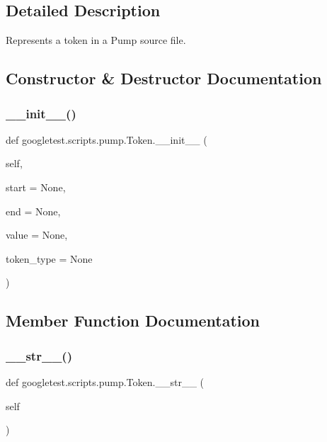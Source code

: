 \subsection{Detailed Description}
\begin{DoxyVerb}Represents a token in a Pump source file.\end{DoxyVerb}
 

\subsection{Constructor \& Destructor Documentation}
\mbox{\label{classgoogletest_1_1scripts_1_1pump_1_1_token_a437e6b5cf6101dfd30b96e72232d5c36}} 
\subsubsection{\texorpdfstring{\_\_init\_\_()}{\_\_init\_\_()}}
{\footnotesize\ttfamily def googletest.\+scripts.\+pump.\+Token.\+\_\+\+\_\+init\+\_\+\+\_\+ (\begin{DoxyParamCaption}\item[{}]{self,  }\item[{}]{start = {\ttfamily None},  }\item[{}]{end = {\ttfamily None},  }\item[{}]{value = {\ttfamily None},  }\item[{}]{token\+\_\+type = {\ttfamily None} }\end{DoxyParamCaption})}



\subsection{Member Function Documentation}
\mbox{\label{classgoogletest_1_1scripts_1_1pump_1_1_token_a5ac4cfd8330080d14fef8bae02398c45}} 
\subsubsection{\texorpdfstring{\_\_str\_\_()}{\_\_str\_\_()}}
{\footnotesize\ttfamily def googletest.\+scripts.\+pump.\+Token.\+\_\+\+\_\+str\+\_\+\+\_\+ (\begin{DoxyParamCaption}\item[{}]{self }\end{DoxyParamCaption})}

